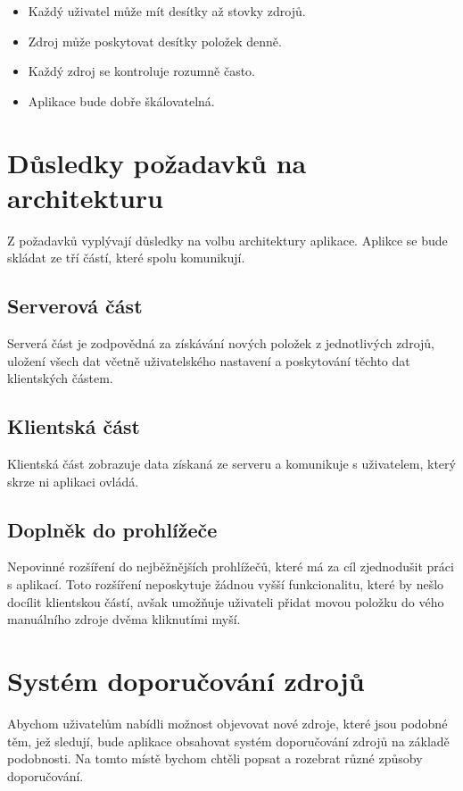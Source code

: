 \begin{itemize}
    \item Každý uživatel může mít desítky až stovky zdrojů.
	\item Zdroj může poskytovat desítky položek denně.
    \item Každý zdroj se kontroluje rozumně často.
    \item Aplikace bude dobře škálovatelná.
\end{itemize}

\section{Důsledky požadavků na architekturu}

Z požadavků vyplývají důsledky na volbu architektury aplikace.
Aplikce se bude skládat ze tří částí, které spolu komunikují.

\subsection{Serverová část}

Serverá část je zodpovědná za získávání nových položek z jednotlivých zdrojů, uložení všech dat včetně uživatelského nastavení a poskytování těchto dat klientských částem.

\subsection{Klientská část}

Klientská část zobrazuje data získaná ze serveru a komunikuje s uživatelem, který skrze ni aplikaci ovládá.

\subsection{Doplněk do prohlížeče}

Nepovinné rozšíření do nejběžnějších prohlížečů, které má za cíl zjednodušit práci s aplikací.
Toto rozšíření neposkytuje žádnou vyšší funkcionalitu, které by nešlo docílit klientskou částí, avšak umožňuje uživateli přidat movou položku do vého manuálního zdroje dvěma kliknutími myší.

\section{Systém doporučování zdrojů}

Abychom uživatelům nabídli možnost objevovat nové zdroje, které jsou podobné těm, jež sledují, bude aplikace obsahovat systém doporučování zdrojů na základě podobnosti.
Na tomto místě bychom chtěli popsat a rozebrat různé způsoby doporučování.


